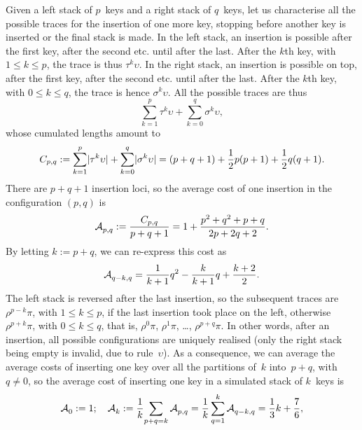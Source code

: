 Given a left stack of \(p\)~keys and a right stack of \(q\)~keys, let
us characterise all the possible traces for the insertion of one more
key, stopping before another key is inserted or the final stack is
made. In the left stack, an insertion is possible after the first key,
after the second etc. until after the last. After the \(k\)th key,
with \(1 \leqslant k \leqslant p\), the trace is thus
\(\tau^k\upsilon\). In the right stack, an insertion is possible on
top, after the first key, after the second etc. until after the
last. After the \(k\)th key, with \(0 \leqslant k \leqslant q\), the
trace is hence \(\sigma^k\upsilon\). All the possible traces are thus
\begin{equation*}
\sum_{k=1}^{p}{\tau^k\upsilon} + \sum_{k=0}^{q}{\sigma^k\upsilon},
\end{equation*}
whose cumulated lengths amount to
\begin{equation*}
C_{p,q} := \sum_{k=1}^{p}\lvert{\tau^k\upsilon}\rvert{} +
\sum_{k=0}^{q}\lvert{\sigma^k\upsilon}\rvert{}
= (p+q+1) + \frac{1}{2}p(p+1) + \frac{1}{2}q(q+1).
\end{equation*}
There are \(p+q+1\) insertion loci, so the average cost of one
insertion in the configuration \((p,q)\) is
\begin{equation}
\mathcal{A}_{p,q}^{} := \frac{C_{p,q}}{p+q+1}
           = 1 + \frac{p^2 + q^2 + p + q}{2p + 2q + 2}.
\label{eq:Mpq}
\end{equation}
By letting \(k := p + q\), we can re\hyp{}express this cost as
\begin{equation*}
\mathcal{A}_{q-k,q}^{} = \frac{1}{k+1}{q^2} - \frac{k}{k+1}{q} + \frac{k+2}{2}.
\end{equation*}
The left stack is reversed after the last insertion, so the subsequent
traces are \(\rho^{p-k}\pi\), with \(1 \leqslant k \leqslant p\), if
the last insertion took place on the left, otherwise
\(\rho^{p+k}\pi\), with \(0 \leqslant k \leqslant q\), that is,
\(\rho^0\pi\), \(\rho^1\pi\), \ldots, \(\rho^{p+q}\pi\). In other
words, after an insertion, all possible configurations are uniquely
realised (only the right stack being empty is invalid, due to
rule~\(\upsilon\)). As a consequence, we can average the average costs
of inserting one key over all the partitions of~\(k\) into~\(p + q\),
with \(q \neq 0\), so the average cost of inserting one key in a
simulated stack of \(k\)~keys is
\begin{equation*}
\mathcal{A}_{0}^{} := 1;\quad
\mathcal{A}_{k}^{} := \frac{1}{k}\!\sum_{p+q=k}\mathcal{A}_{p,q}^{}
         = \frac{1}{k}\sum_{q=1}^{k}\mathcal{A}_{q-k,q}^{}
         = \frac{1}{3}k + \frac{7}{6},
\end{equation*}
